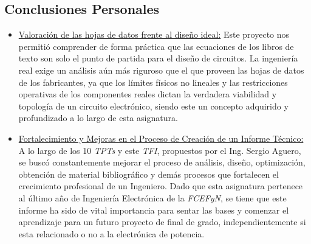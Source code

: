 \documentclass[12pt,a4paper]{article}
\begin{document}
\subsection{Conclusiones Personales}                                        \label{sec_3.2}
\begin{itemize}
    \item \underline{Valoración de las hojas de datos frente al diseño ideal:} Este proyecto nos permitió comprender de forma práctica que las ecuaciones de los libros de texto son solo el punto de partida para el diseño de circuitos. La ingeniería real exige un análisis aún más riguroso que el que proveen las hojas de datos de los fabricantes, ya que los límites físicos no lineales y las restricciones operativas de los componentes reales dictan la verdadera viabilidad y topología de un circuito electrónico, siendo este un concepto adquirido y profundizado a lo largo de esta asignatura.

    \item \underline{Fortalecimiento y Mejoras en el Proceso de Creación de un Informe Técnico:} A lo largo de los 10 \textit{TPTs} y este \textit{TFI}, propuestos por el Ing. Sergio Aguero, se buscó constantemente mejorar el proceso de análisis, diseño, optimización, obtención de material bibliográfico y demás procesos que fortalecen el crecimiento profesional de un Ingeniero. Dado que esta asignatura pertenece al último año de Ingeniería Electrónica de la \textit{FCEFyN}, se tiene que este informe ha sido de vital importancia para sentar las bases y comenzar el aprendizaje para un futuro proyecto de final de grado, independientemente si esta relacionado o no a la electrónica de potencia.
\end{itemize}



\newpage
\printbibliography[heading=bibintoc, title={4. \ Bibliografía}]             \label{sec_4}



\newpage
\appendix
\end{document}
